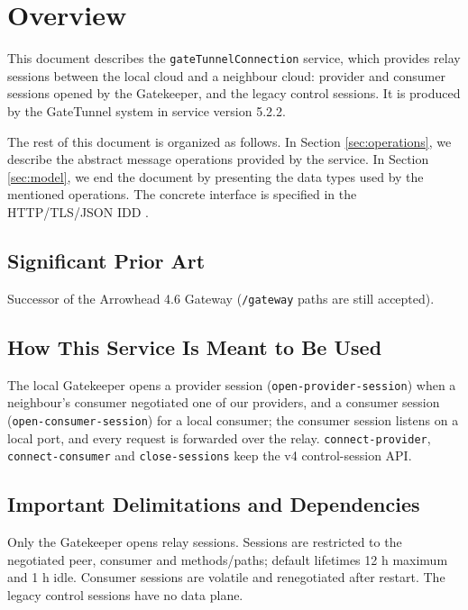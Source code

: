 \documentclass[a4paper]{arrowhead}
\begin{document}
\section{Overview}
\label{sec:overview}

This document describes the \texttt{gate\allowbreak{}Tunnel\allowbreak{}Connection} service, which provides relay sessions between the local cloud and a neighbour cloud: provider and consumer sessions opened by the Gatekeeper, and the legacy control sessions.
It is produced by the GateTunnel system \cite{gt-sysd} in service version 5.2.2.

The rest of this document is organized as follows.
In Section \ref{sec:operations}, we describe the abstract message operations provided by the service.
In Section \ref{sec:model}, we end the document by presenting the data types used by the mentioned operations.
The concrete interface is specified in the HTTP/TLS/JSON IDD \cite{gt-gateTunnelConnection-http-idd}.

\subsection{Significant Prior Art}

Successor of the Arrowhead 4.6 Gateway (\texttt{/\allowbreak{}gateway} paths are still accepted).

\subsection{How This Service Is Meant to Be Used}

The local Gatekeeper opens a provider session (\texttt{open-\allowbreak{}provider-\allowbreak{}session}) when a neighbour's consumer negotiated one of our providers, and a consumer session (\texttt{open-\allowbreak{}consumer-\allowbreak{}session}) for a local consumer; the consumer session listens on a local port, and every request is forwarded over the relay. \texttt{connect-\allowbreak{}provider}, \texttt{connect-\allowbreak{}consumer} and \texttt{close-\allowbreak{}sessions} keep the v4 control-session API.

\subsection{Important Delimitations and Dependencies}
\label{sec:delimitations}

Only the Gatekeeper opens relay sessions. Sessions are restricted to the negotiated peer, consumer and methods/paths; default lifetimes 12 h maximum and 1 h idle. Consumer sessions are volatile and renegotiated after restart. The legacy control sessions have no data plane.
\end{document}
